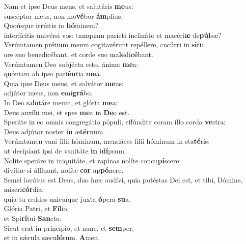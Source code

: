 \evenverse Nam et ipse Deus meus, et salutáris \textbf{me}us:~\*\\
\evenverse suscéptor meus, non mo\textbf{vé}bor \textbf{ám}plius.\\
\oddverse Quoúsque irrúitis in \textbf{hó}minem?~\*\\
\oddverse interfícitis univérsi vos: tamquam paríeti inclináto et macéri\textbf{æ} de\textbf{púl}sæ?\\
\evenverse Verúmtamen prétium meum cogitavérunt repéllere, cucúrri in \textbf{si}ti:~\*\\
\evenverse ore suo benedicébant, et corde suo ma\textbf{le}di\textbf{cé}bant.\\
\oddverse Verúmtamen Deo subjécta esto, ánima \textbf{me}a:~\*\\
\oddverse quóniam ab ipso pati\textbf{én}tia \textbf{me}a.\\
\evenverse Quia ipse Deus meus, et salvátor \textbf{me}us:~\*\\
\evenverse adjútor meus, non \textbf{e}mi\textbf{grá}bo.\\
\oddverse In Deo salutáre meum, et glória \textbf{me}a:~\*\\
\oddverse Deus auxílii mei, et spes \textbf{me}a in \textbf{De}o est.\\
\evenverse Speráte in eo omnis congregátio pópuli, effúndite coram illo corda \textbf{ve}stra:~\*\\
\evenverse Deus adjútor noster \textbf{in} æ\textbf{tér}num.\\
\oddverse Verúmtamen vani fílii hóminum, mendáces fílii hóminum in sta\textbf{té}ris:~\*\\
\oddverse ut decípiant ipsi de vanitáte \textbf{in} i\textbf{dí}psum.\\
\evenverse Nolíte speráre in iniquitáte, et rapínas nolíte concu\textbf{pí}scere:~\*\\
\evenverse divítiæ si áffluant, nolíte \textbf{cor} ap\textbf{pó}nere.\\
\oddverse Semel locútus est Deus, duo hæc audívi, quia potéstas Dei est, et tibi, Dómine, miseri\textbf{cór}dia:~\*\\
\oddverse quia tu reddes unicuíque juxta \textbf{ó}pera \textbf{su}a.\\
\evenverse Glória Patri, et \textbf{Fí}lio,~\*\\
\evenverse et Spi\textbf{rí}tui \textbf{San}cto.\\
\oddverse Sicut erat in princípio, et nunc, et \textbf{sem}per,~\*\\
\oddverse et in sǽcula sæcu\textbf{ló}rum. \textbf{A}men.\\
